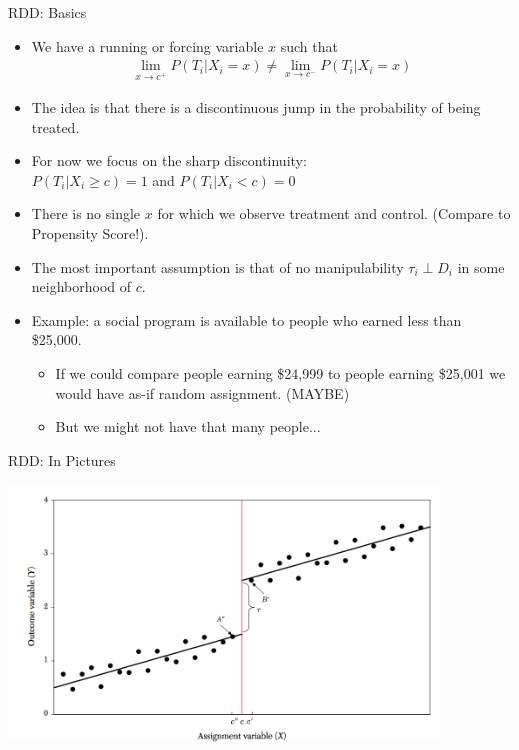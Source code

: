 \documentclass[xcolor=pdftex,dvipsnames,table,mathserif]{beamer}
\begin{document}
\begin{frame}{RDD: Basics}
\begin{itemize}
\item We have a \alert{running or forcing variable} $x$ such that 
\begin{eqnarray*}
\lim_{x\rightarrow c^{+}} P(T_i | X_i = x) \neq \lim_{x\rightarrow c^{-}}P(T_i | X_i = x)
\end{eqnarray*}
\item The idea is that there is a \alert{discontinuous jump} in the \alert{probability of being treated}.
\item For now we focus on the \alert{sharp discontinuity}:\\
 $P(T_i | X_i \geq c) =1$ and $P(T_i | X_i < c) =0$
 \item There is no single $x$ for which we observe treatment and control. (Compare to Propensity Score!).
\item The most important assumption is that of \alert{no manipulability} $\tau_i \perp D_i$ in some neighborhood of $c$.
\item Example: a social program is available to people who earned less than \$25,000.
\begin{itemize}              
\item If we could compare people earning \$24,999 to people earning \$25,001 we would have as-if random assignment. (MAYBE)
\item But we might not have that many people...
\end{itemize}
\end{itemize}              
\end{frame}


\begin{frame}{RDD: In Pictures}
\begin{center}
\includegraphics[width=4.5in]{./resources/ll-fig1}
\end{center}
\end{frame}
\end{document}
